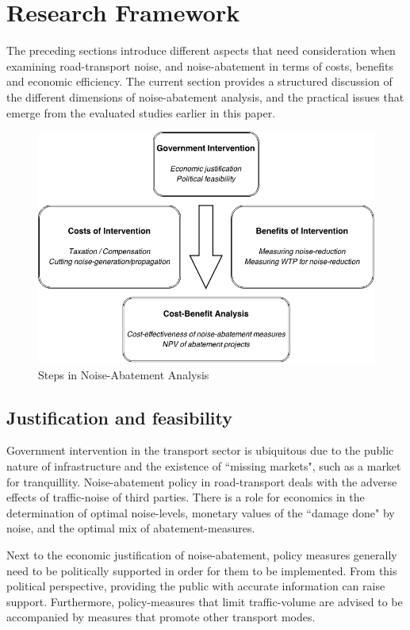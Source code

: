 \documentclass[a4paper]{scrartcl}
\begin{document}
\section{Research Framework}

The preceding sections introduce different aspects that need consideration when examining road-transport noise, and noise-abatement in terms of costs, benefits and economic efficiency. The current section provides a structured discussion of the different dimensions of noise-abatement analysis, and the practical issues that emerge from the evaluated studies earlier in this paper. 

\begin{figure}[h]
	\caption{Steps in Noise-Abatement Analysis}
	\centering
	\includegraphics[width=\textwidth]{Graph1}
\end{figure}

\subsection{Justification and feasibility}

Government intervention in the transport sector is ubiquitous due to the public nature of infrastructure and the existence of ``missing markets", such as a market for tranquillity. Noise-abatement policy in road-transport deals with the adverse effects of traffic-noise of third parties. There is a role for economics in the determination of  optimal noise-levels, monetary values of the ``damage done" by noise, and the optimal mix of abatement-measures. 

Next to the economic justification of noise-abatement, policy measures generally need to be politically supported in order for them to be implemented. From this political perspective, providing the public with accurate information can raise support. Furthermore, policy-measures that limit traffic-volume are advised to be accompanied by measures that promote other transport modes.
\end{document}

